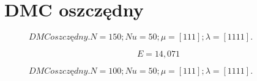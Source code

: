 

%     



%     



%     


\section{DMC oszczędny}

\begin{figure}[H]
    \centering
    
    \caption{$DMC oszczędny. N = 150; Nu = 50; \mu = [1 1 1]; \lambda = [1 1 1 1].$}
\end{figure}

\begin{equation}
    E = 14,071
\end{equation}

\begin{figure}[H]
    \centering
    
    \caption{$DMC oszczędny. N = 100; Nu = 50; \mu = [1 1 1]; \lambda = [1 1 1 1].$}
\end{figure}

